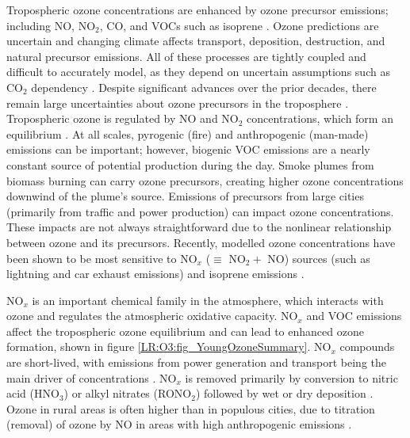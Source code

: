     
    Tropospheric ozone concentrations are enhanced by ozone precursor 
    emissions; including NO, NO$_2$, CO, and VOCs such as isoprene 
    \parencite{Atkinson2000, Young2013, Marvin2017}.
    Ozone predictions are uncertain and changing climate affects transport, 
    deposition, destruction, and natural precursor emissions.
    All of these processes are tightly coupled and difficult to accurately 
    model, as they depend on uncertain assumptions such as CO$_2$ dependency 
    \parencite{Young2013}.
    Despite significant advances over the prior decades, there remain large 
    uncertainties about ozone precursors in the troposphere 
    \parencite{Mazzuca2016}.
    Tropospheric ozone is regulated by NO and NO$_2$ concentrations, which form 
    an equilibrium \parencite{Cape2008,Young2018}.
    At all scales, pyrogenic (fire) and anthropogenic (man-made) emissions can 
    be important; however, biogenic VOC emissions are a nearly constant source 
    of potential production during the day.
    Smoke plumes from biomass burning can carry ozone precursors, creating 
    higher ozone concentrations downwind of the plume's source.
    Emissions of precursors from large cities (primarily from traffic and power 
    production) can impact ozone concentrations.
    These impacts are not always straightforward due to the nonlinear 
    relationship between ozone and its precursors.
    Recently, modelled ozone concentrations have been shown to be most 
    sensitive to NO$_x$ ($\equiv $ NO$_2 +$ NO) sources (such as lightning and 
    car exhaust emissions) and isoprene emissions \parencite{Christian2018}.
    
    NO$_x$ is an important chemical family in the atmosphere, which interacts 
    with ozone and regulates the atmospheric oxidative capacity.
    NO$_x$ and VOC emissions affect the tropospheric ozone equilibrium and can 
    lead to enhanced ozone formation, shown in figure 
    \ref{LR:O3:fig_YoungOzoneSummary}.
    NO$_x$ compounds are short-lived, with emissions from power generation and 
    transport being the main driver of concentrations \parencite{Delmas1997}.
    NO$_x$ is removed primarily by conversion to nitric acid (HNO$_3$) or alkyl 
    nitrates (RONO$_2$) followed by wet or dry deposition 
    \parencite{Ayers2006,Present2019}.
    Ozone in rural areas is often higher than in populous cities, due to 
    titration (removal) of ozone by NO in areas with high anthropogenic 
    emissions \parencite{Cooper2014,Monks2015}.
    
